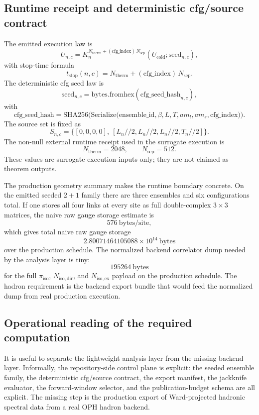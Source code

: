 \documentclass[11pt]{article}
\begin{document}
\subsection{Runtime receipt and deterministic cfg/source contract}

The emitted execution law is
\[
U_{n,c}
=
K_n^{N_{\mathrm{therm}} + (\mathrm{cfg\_index})\,N_{\mathrm{sep}}}(U_{\mathrm{cold}}; \mathrm{seed}_{n,c}),
\]
with stop-time formula
\[
t_{\mathrm{stop}}(n,c)
=
N_{\mathrm{therm}} + (\mathrm{cfg\_index})\,N_{\mathrm{sep}}.
\]
The deterministic cfg seed law is
\[
\mathrm{seed}_{n,c}
=
\mathrm{bytes.fromhex}(\mathrm{cfg\_seed\_hash}_{n,c}),
\]
with
\[
\mathrm{cfg\_seed\_hash}
=
\mathrm{SHA256}\!\Big(
\mathrm{Serialize}\!\big(
\mathrm{ensemble\_id},\beta,L,T,a m_l,a m_s,\mathrm{cfg\_index}
\big)
\Big).
\]
The source set is fixed as
\[
S_{n,c} = \{ [0,0,0,0],\ [L_n//2, L_n//2, L_n//2, T_n//2] \}.
\]
The non-null external runtime receipt used in the surrogate execution is
\[
N_{\mathrm{therm}} = 2048,
\qquad
N_{\mathrm{sep}} = 512.
\]
These values are surrogate execution inputs only; they are not claimed as theorem outputs.

The production geometry summary makes the runtime boundary concrete. On the emitted
seeded \(2+1\) family there are three ensembles and six configurations total. If one stores all
four links at every site as full double-complex \(3\times 3\) matrices, the naive raw gauge
storage estimate is
\[
576\ \mathrm{bytes/site},
\]
which gives total naive raw gauge storage
\[
2.80071464105088\times 10^{14}\ \mathrm{bytes}
\]
over the production schedule. The normalized backend correlator dump needed by the
analysis layer is tiny:
\[
195264\ \mathrm{bytes}
\]
for the full \(\pi_{\mathrm{iso}}\), \(N_{\mathrm{iso,dir}}\), and \(N_{\mathrm{iso,ex}}\)
payload on the production schedule. The hadron requirement is the backend export bundle
that would feed the normalized dump from real production execution.

\subsection{Operational reading of the required computation}

It is useful to separate the lightweight analysis layer from the missing backend layer.
Informally, the repository-side control plane is explicit: the seeded ensemble family, the
deterministic cfg/source contract, the export manifest, the jackknife evaluator, the forward-window
selector, and the publication-budget schema are all explicit. The missing step is the production
export of Ward-projected hadronic spectral data from a real OPH hadron backend.
\end{document}
